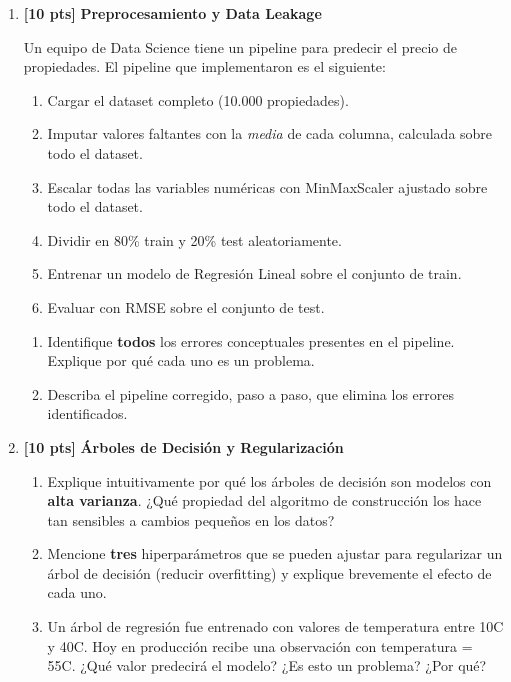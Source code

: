 \documentclass[11pt,a4paper]{article}
\newcommand{\puntaje}[1]{\textbf{[#1 pts]}}
\begin{document}
\begin{enumerate}[label=\textbf{\arabic*.}, leftmargin=*, itemsep=10pt]

\item \puntaje{10} \textbf{Preprocesamiento y Data Leakage}

Un equipo de Data Science tiene un pipeline para predecir el precio de propiedades. El pipeline que implementaron es el siguiente:

\begin{enumerate}[label=\Roman*.]
  \item Cargar el dataset completo (10.000 propiedades).
  \item Imputar valores faltantes con la \textit{media} de cada columna, calculada sobre todo el dataset.
  \item Escalar todas las variables num\'ericas con MinMaxScaler ajustado sobre todo el dataset.
  \item Dividir en 80\% train y 20\% test aleatoriamente.
  \item Entrenar un modelo de Regresi\'on Lineal sobre el conjunto de train.
  \item Evaluar con RMSE sobre el conjunto de test.
\end{enumerate}

\begin{enumerate}[label=\textbf{\alph*)}]
  \item Identifique \textbf{todos} los errores conceptuales presentes en el pipeline. Explique por qu\'e cada uno es un problema.
  \vspace{4cm}
  \item Describa el pipeline corregido, paso a paso, que elimina los errores identificados.
  \vspace{4cm}
\end{enumerate}

\item \puntaje{10} \textbf{\'Arboles de Decisi\'on y Regularizaci\'on}

\begin{enumerate}[label=\textbf{\alph*)}]
  \item Explique intuitivamente por qu\'e los \'arboles de decisi\'on son modelos con \textbf{alta varianza}. ¿Qu\'e propiedad del algoritmo de construcci\'on los hace tan sensibles a cambios peque\~nos en los datos?
  \vspace{3.5cm}
  \item Mencione \textbf{tres} hiperpar\'ametros que se pueden ajustar para regularizar un \'arbol de decisi\'on (reducir overfitting) y explique brevemente el efecto de cada uno.
  \vspace{3.5cm}
  \item Un \'arbol de regresi\'on fue entrenado con valores de temperatura entre 10\textdegree C y 40\textdegree C. Hoy en producci\'on recibe una observaci\'on con temperatura = 55\textdegree C. ¿Qu\'e valor predecir\'a el modelo? ¿Es esto un problema? ¿Por qu\'e?
  \vspace{3cm}
\end{enumerate}


\end{enumerate}
\end{document}
